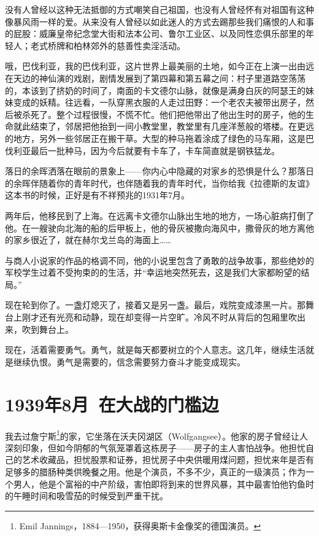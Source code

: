 \documentclass[UTF8]{ctexart}
\begin{document}
没有人曾经以这种无法抵御的方式嘲笑自己祖国，也没有人曾经怀有对祖国有这种像暴风雨一样的爱。从来没有人曾经以如此迷人的方式去踢那些我们痛恨的人和事的屁股：威廉皇帝纪念堂大街和法本公司、鲁尔工业区、以及同性恋俱乐部里的年轻人；老式桥牌和柏林郊外的慈善性卖淫活动。

哦，巴伐利亚，我的巴伐利亚，这片世界上最美丽的土地，如今正在上演一出由远在天边的神仙演的戏剧，剧情发展到了第四幕和第五幕之间：村子里道路空荡荡的，本该到了挤奶的时间了，南面的卡文德尔山脉，就像是满身白灰的阿瑟王的妹妹变成的妖精。往远看，一队穿黑衣服的人走过田野：一个老农夫被带出房子，然后被杀死了。整个过程很慢，不慌不忙。他们把他带出了他出生时的房子，他的生命就此结束了，邻居把他抬到一间小教堂里，教堂里有几座洋葱般的塔楼。在更远的地方，另外一些邻居正在搬干草。大型的种马拖着涂成了绿色的马车厢，这是巴伐利亚最后一批种马，因为今后就要有卡车了，卡车简直就是钢铁猛龙。

落日的余晖洒落在眼前的景象上——你内心中隐藏的对家乡的恐惧是什么？那落日的余晖伴随着你的青年时代，也伴随着我的青年时代，当你给我《拉德斯的友谊》这本书的时候，正好是有不祥预兆的1931年7月。

两年后，他移民到了上海。在远离卡文德尔山脉出生地的地方，一场心脏病打倒了他。在一艘驶向北海的船的后甲板上，他的骨灰被撒向海风中，撒骨灰的地方离他的家乡很近了，就在赫尔戈兰岛的海面上……

与商人小说家的作品的格调不同，他的小说里包含了勇敢的战争故事，那些绝妙的军校学生过着不受拘束的的生活，并“幸运地突然死去，这是我们大家都盼望的结局。”

现在轮到你了。一盏灯熄灭了，接着又是另一盏。最后，戏院变成漆黑一片。那舞台上刚才还有光亮和动静，现在却变得一片空旷。冷风不时从背后的包厢里吹出来，吹到舞台上。

现在，活着需要勇气。勇气，就是每天都要树立的个人意志。这几年，继续生活就是继续仇恨。勇气是需要的，信念需要努力奋斗才能变成现实。

\section{1939年8月\ 在大战的门槛边}

我去过詹宁斯\footnote{Emil Jannings，1884—1950，获得奥斯卡金像奖的德国演员。}的家，它坐落在沃夫冈湖区（Wolfgangsee）。他家的房子曾经让人深刻印象，但如今阴郁的气氛笼罩着这栋房子——房子的主人害怕战争。他担忧自己的艺术收藏品，担忧股票和证券，担忧房子中央供暖用煤问题，担忧来年是否有足够多的腊肠种类供晚餐之用。他是个演员，不多不少，真正的一级演员；作为一个男人，他是个富裕的中产阶级，害怕即将到来的世界风暴，其中最害怕他钓鱼时的午睡时间和吸雪茄的时候受到严重干扰。
\end{document}
